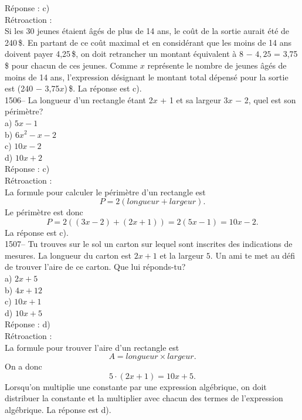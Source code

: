 R\'eponse : c)\\

R\'etroaction :\\
Si les 30 jeunes \'etaient \^ag\'es de plus de 14 ans, le co\^ut de
la sortie aurait \'et\'e de 240\,\$. En partant de ce co\^ut maximal
et en consid\'erant que les moins de 14 ans doivent payer 4,25\,\$,
on doit retrancher un montant \'equivalent \`a  $8$ $-$ $4,25$ =
{\textrm{ 3,75\,\$}} pour chacun de ces jeunes. Comme $x$
repr\'esente le nombre de jeunes \^ag\'es de moins de 14 ans,
l'expression d\'esignant le
montant total d\'epens\'e pour la sortie est (240 $-$ 3,75$x$)\,\$. La
r\'eponse est c).\\

1506-- La longueur d'un rectangle \'etant 2$x$ + 1 et sa largeur
3$x$ $-$ 2, quel est son p\'erim\`etre?\\
a) $5x-1$\\
b) $6x^2-x-2$\\
c) $10x-2$\\
d) $10x+2$\\

R\'eponse : c)\\

R\'etroaction :\\
La formule pour calculer le p\'erim\`etre d'un rectangle est
$$P=2 (longueur+largeur).$$ Le p\'erim\`etre est
donc $$P=2 ((3x-2)+(2x+1))=2(5x-1)=10x-2.$$ La r\'eponse est c).\\

1507-- Tu trouves sur le sol un carton sur lequel sont inscrites des
indications de mesures. La longueur du carton est $2x+1$ et la
largeur $5$. Un ami te met au d\'efi de
trouver l'aire de ce carton. Que lui r\'eponds-tu?\\
a) $2x+5$\\
b) $4x+12$\\
c) $10x+1$\\
d) $10x+5$\\

R\'eponse : d)\\

R\'etroaction :\\
La formule pour trouver l'aire d'un rectangle est
$$A=longueur\times largeur.$$ On a donc $$5\cdot(2x+1)=10x+5.$$ Lorsqu'on
multiplie une constante par une
expression alg\'ebrique, on doit distribuer la constante et la
multiplier avec chacun des termes de
l'expression alg\'ebrique. La r\'eponse est d).\\

